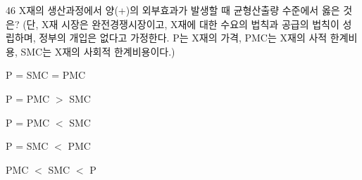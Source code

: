 \begin{question}{46}
X재의 생산과정에서 양(+)의 외부효과가 발생할 때 균형산출량 수준에서 옳은 것은? (단, X재 시장은 완전경쟁시장이고, X재에 대한 수요의 법칙과 공급의 법칙이 성립하며, 정부의 개입은 없다고 가정한다. P는 X재의 가격, PMC는 X재의 사적 한계비용, SMC는 X재의 사회적 한계비용이다.)
\begin{choices}
  \item P = SMC = PMC
  \item P = PMC $>$ SMC
  \item P = PMC $<$ SMC
  \item P = SMC $<$ PMC
  \item PMC $<$ SMC $<$ P
\end{choices}
\end{question}
